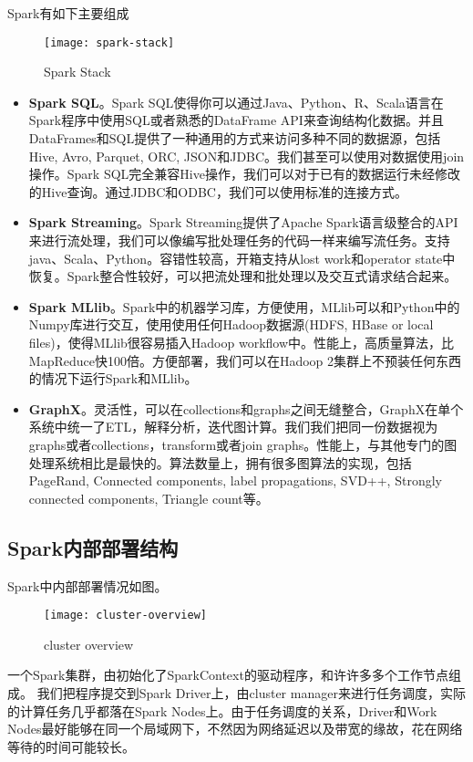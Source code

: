 Spark有如下主要组成
\begin{figure}[ht]
\centering
\texttt{[image: spark-stack]}
\caption{Spark Stack}
\end{figure}
\begin{itemize}
    \item \textbf{Spark SQL}。Spark SQL使得你可以通过Java、Python、R、Scala语言在Spark程序中使用SQL或者熟悉的DataFrame API来查询结构化数据。并且DataFrames和SQL提供了一种通用的方式来访问多种不同的数据源，包括Hive, Avro, Parquet, ORC, JSON和JDBC。我们甚至可以使用对数据使用join操作。Spark SQL完全兼容Hive操作，我们可以对于已有的数据运行未经修改的Hive查询。通过JDBC和ODBC，我们可以使用标准的连接方式。
    \item \textbf{Spark Streaming}。Spark Streaming提供了Apache Spark语言级整合的API来进行流处理，我们可以像编写批处理任务的代码一样来编写流任务。支持java、Scala、Python。容错性较高，开箱支持从lost work和operator state中恢复。Spark整合性较好，可以把流处理和批处理以及交互式请求结合起来。
    \item \textbf{Spark MLlib}。Spark中的机器学习库，方便使用，MLlib可以和Python中的Numpy库进行交互，使用使用任何Hadoop数据源(HDFS, HBase or local files)，使得MLlib很容易插入Hadoop workflow中。性能上，高质量算法，比MapReduce快100倍。方便部署，我们可以在Hadoop 2集群上不预装任何东西的情况下运行Spark和MLlib。
    \item \textbf{GraphX}。灵活性，可以在collections和graphs之间无缝整合，GraphX在单个系统中统一了ETL，解释分析，迭代图计算。我们我们把同一份数据视为graphs或者collections，transform或者join graphs。性能上，与其他专门的图处理系统相比是最快的。算法数量上，拥有很多图算法的实现，包括PageRand, Connected components, label propagations, SVD++, Strongly connected components, Triangle count等。
\end{itemize}

\subsection{Spark内部部署结构}
Spark中内部部署情况如图。
\begin{figure}[ht]
\centering
\texttt{[image: cluster-overview]}
\caption{cluster overview}
\end{figure}
一个Spark集群，由初始化了SparkContext的驱动程序，和许许多多个工作节点组成。
我们把程序提交到Spark Driver上，由cluster manager来进行任务调度，实际的计算任务几乎都落在Spark Nodes上。由于任务调度的关系，Driver和Work Nodes最好能够在同一个局域网下，不然因为网络延迟以及带宽的缘故，花在网络等待的时间可能较长。

